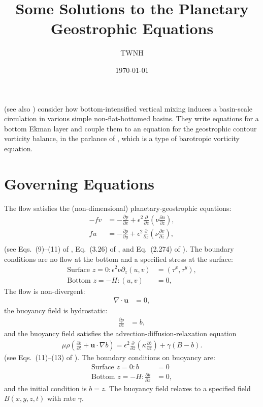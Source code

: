 \documentclass[10pt]{amsart}
\title{Some Solutions to the Planetary Geostrophic Equations}
\author{TWNH}
\date{\today}                                           %
\begin{document}
\maketitle

\citet{peterson&callies26} (see also \citealt{peterson&callies23}) consider how bottom-intensified vertical mixing induces a basin-scale circulation in various simple non-flat-bottomed basins.
They write equations for a bottom Ekman layer and couple them to an equation for the geostrophic contour vorticity balance, in the parlance of \citet{waldman&giordani23}, which is a type of barotropic vorticity equation.

\section{Governing Equations}
The flow satisfies the (non-dimensional) planetary-geostrophic equations:
\begin{align}
- f v & = - \frac{\partial p}{\partial x} + \epsilon^2 \frac{\partial}{\partial z} \left( \nu \frac{\partial u}{\partial z} \right), \label{eqn:u_mom} \\
f  u & = - \frac{\partial p}{\partial y} + \epsilon^2 \frac{\partial}{\partial z} \left( \nu \frac{\partial v}{\partial z} \right),  \label{eqn:v_mom} \\
\end{align}
(see Eqs.~(9)--(11) of \citealt{peterson&callies26}, Eq.~(3.26) of \citealt{klinger&haine19}, and Eq.~(2.274) of \citealt{vallis06}).
The boundary conditions are no flow at the bottom and a specified stress at the surface:
\begin{align}
\text{Surface~}z = 0:
\epsilon^2 \nu \partial_z (u, v) & = (\tau^x , \tau^y ), 
 \\
\text{Bottom~}z = -H:
(u, v) & = 0 ,
\end{align}
The flow is non-divergent:
\begin{align}
\nabla \cdot {\mathbf u} & = 0 ,
\label{eqn:non-divergent}
\end{align}
the buoyancy field is hydrostatic:
\begin{align}
\frac{\partial p}{\partial z} & = b ,
\end{align}
and the buoyancy field satisfies the advection-diffusion-relaxation equation
\begin{align}
\mu \rho \left( \frac{\partial b}{\partial t} + {\mathbf u} \cdot \nabla b \right) = \epsilon^2 \frac{\partial }{\partial z} \left( \kappa \frac{\partial b}{\partial z} \right) + \gamma \left( B - b \right).
\label{eqn:b}
\end{align}
(see Eqs.~(11)--(13) of \citealt{peterson&callies26}).
The boundary conditions on buoyancy are:
\begin{align}
\text{Surface~}z = 0:
b &= 0
\label{eqn:sfc_b_bc}
 \\
\text{Bottom~}z = -H:
\frac{\partial b}{\partial z} &= 0 ,
\label{eqn:bot_b_bc}
\end{align}
and the initial condition is $b = z$.
The buoyancy field relaxes to a specified field $B(x, y, z, t)$ with rate $\gamma$.
\end{document}
